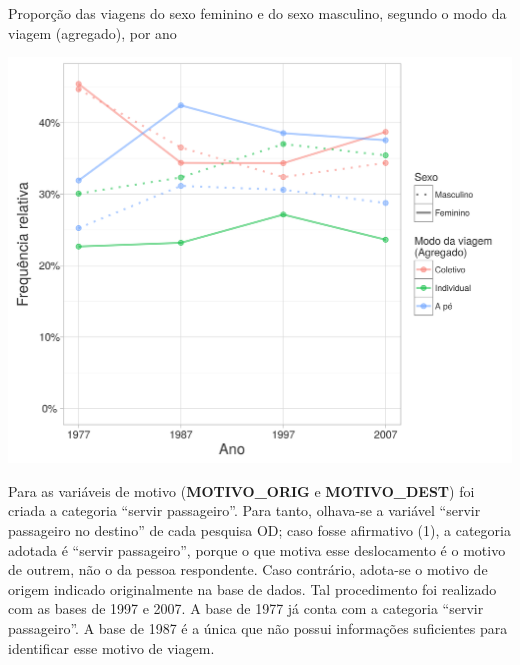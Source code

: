 \begin{grafico}[htb]%
    \caption{\label{graf:freq-tipo-viag}Proporção das viagens do sexo feminino e do sexo masculino, segundo o modo da viagem (agregado), por ano}%
    \begin{center}%
        \includegraphics[width=1\textwidth]{./imagens/freq-tipo-viag.png}%
    \end{center}%
\end{grafico}%

Para as variáveis de motivo (\textbf{MOTIVO_ORIG} e \textbf{MOTIVO_DEST}) foi criada a categoria ``servir passageiro''. Para tanto, olhava-se a variável ``servir passageiro no destino'' de cada pesquisa OD; caso fosse afirmativo (1), a categoria adotada é ``servir passageiro'', porque o que motiva esse deslocamento é o motivo de outrem, não o da pessoa respondente. Caso contrário, adota-se o motivo de origem indicado originalmente na base de dados. Tal procedimento foi realizado com as bases de 1997 e 2007. A base de 1977 já conta com a categoria ``servir passageiro''. A base de 1987 é a única que não possui informações suficientes para identificar esse motivo de viagem.

